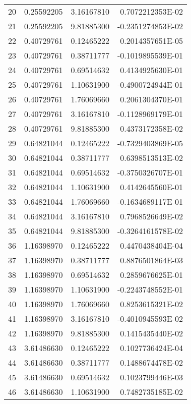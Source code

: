 \begin{longtable}{@{\extracolsep{\fill}}cllr@{}}
20  &  0.25592205  &  3.16167810  &   0.7072212353E-02 \\
21  &  0.25592205  &  9.81885300  &  -0.2351274853E-02 \\
22  &  0.40729761  &  0.12465222  &   0.2014357651E-05 \\
23  &  0.40729761  &  0.38711777  &  -0.1019895539E-01 \\
24  &  0.40729761  &  0.69514632  &   0.4134925630E-01 \\
25  &  0.40729761  &  1.10631900  &  -0.4900724944E-01 \\
26  &  0.40729761  &  1.76069660  &   0.2061304370E-01 \\
27  &  0.40729761  &  3.16167810  &  -0.1128969179E-01 \\
28  &  0.40729761  &  9.81885300  &   0.4373172358E-02 \\
29  &  0.64821044  &  0.12465222  &  -0.7329403869E-05 \\
30  &  0.64821044  &  0.38711777  &   0.6398513513E-02 \\
31  &  0.64821044  &  0.69514632  &  -0.3750326707E-01 \\
32  &  0.64821044  &  1.10631900  &   0.4142645560E-01 \\
33  &  0.64821044  &  1.76069660  &  -0.1634689117E-01 \\
34  &  0.64821044  &  3.16167810  &   0.7968526649E-02 \\
35  &  0.64821044  &  9.81885300  &  -0.3264161578E-02 \\
36  &  1.16398970  &  0.12465222  &   0.4470438404E-04 \\
37  &  1.16398970  &  0.38711777  &   0.8876501864E-03 \\
38  &  1.16398970  &  0.69514632  &   0.2859676625E-01 \\
39  &  1.16398970  &  1.10631900  &  -0.2243748552E-01 \\
40  &  1.16398970  &  1.76069660  &   0.8253615321E-02 \\
41  &  1.16398970  &  3.16167810  &  -0.4010945593E-02 \\
42  &  1.16398970  &  9.81885300  &   0.1415435440E-02 \\
43  &  3.61486630  &  0.12465222  &   0.1027736424E-04 \\
44  &  3.61486630  &  0.38711777  &   0.1488674478E-02 \\
45  &  3.61486630  &  0.69514632  &   0.1023799446E-03 \\
46  &  3.61486630  &  1.10631900  &   0.7482735185E-02 \\

\end{longtable}
